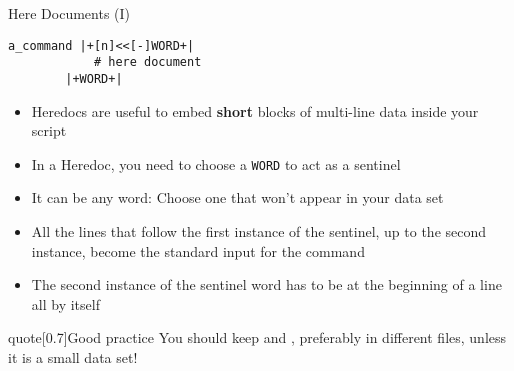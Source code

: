 \begin{frame}[fragile]{Here Documents (I)}
    \vspace{-1mm}
    \begin{lstlisting}[style=MyBash, numbers=none]
        a_command |+[n]<<[-]WORD+|
            # here document
        |+WORD+|
    \end{lstlisting}
    \vspace{2mm}
    \begin{itemize}
        \item Heredocs are useful to embed \textbf{short} blocks of multi-line data inside your script\\[-0.5ex]
        \item In a Heredoc, you need to choose a \texttt{WORD} to act as a sentinel
        \item It can be any word: Choose one that won't appear in your data set
        \item All the lines that follow the first instance of the sentinel, up to the second instance, become the standard input for the command
        \item The second instance of the sentinel word has to be \alert{at the beginning of a line all by itself}
    \end{itemize}
    \begin{varblock}{quote}[0.7\textwidth]{Good practice}
        \textnormal{You should keep   and   , preferably in different files, unless it is a small data set!}
    \end{varblock}
\end{frame}
